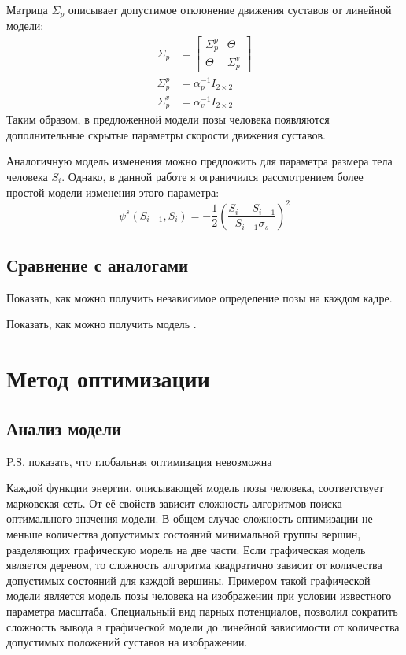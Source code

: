 Матрица $\Sigma_p$ описывает допустимое отклонение движения суставов от линейной модели:
\begin{equation}
	\begin{aligned}
		\Sigma_p &= \left[
			\begin{array}{c|c}
			\Sigma_p^p & \Theta \\ \hline
			\Theta     & \Sigma_p^v
			\end{array}
			\right] \\
		\Sigma_p^p &= \alpha_p^{-1} I_{2\times2} \\
		\Sigma_p^v &= \alpha_v^{-1} I_{2\times2}
	\end{aligned}
\end{equation}
Таким образом, в предложенной модели позы человека появляются дополнительные скрытые параметры скорости движения суставов.

Аналогичную модель изменения можно предложить для параметра размера тела человека $S_i$. Однако, в данной работе я ограничился рассмотрением более простой модели изменения этого параметра:
\begin{equation}
	\psi^s(S_{i-1}, S_i) = -\frac{1}{2} \left(\frac{S_i - S_{i-1}}{S_{i-1}\sigma_s}\right)^2
\end{equation}

\subsection{Сравнение с аналогами}

Показать, как можно получить независимое определение позы на каждом кадре.

Показать, как можно получить модель \cite{park2011n}.

\section{Метод оптимизации}

\subsection{Анализ модели} P.S. показать, что глобальная оптимизация невозможна

Каждой функции энергии, описывающей модель позы человека, соответствует марковская сеть. От её свойств зависит сложность алгоритмов поиска оптимального значения модели. В общем случае сложность оптимизации не меньше количества допустимых состояний минимальной группы вершин, разделяющих графическую модель на две части. Если графическая модель является деревом, то сложность алгоритма квадратично зависит от количества допустимых состояний для каждой вершины. Примером такой графической модели является модель позы человека на изображении при условии известного параметра масштаба. Специальный вид парных потенциалов, позволил сократить сложность вывода в графической модели до линейной зависимости от количества допустимых положений суставов на изображении.

